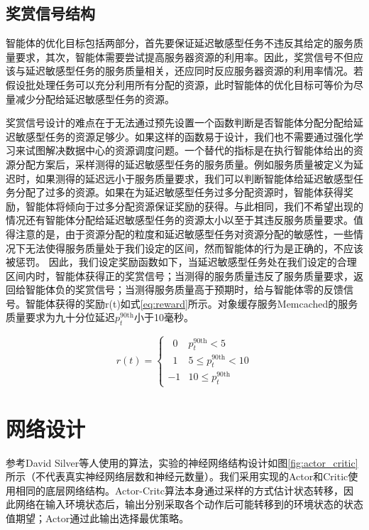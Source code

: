 \subsection{奖赏信号结构}
智能体的优化目标包括两部分，首先要保证延迟敏感型任务不违反其给定的服务质量要求，其次，智能体需要尝试提高服务器资源的利用率。因此，奖赏信号不但应该与延迟敏感型任务的服务质量相关，还应同时反应服务器资源的利用率情况。若假设批处理任务可以充分利用所有分配的资源，此时智能体的优化目标可等价为尽量减少分配给延迟敏感型任务的资源。

奖赏信号设计的难点在于无法通过预先设置一个函数判断是否智能体分配分配给延迟敏感型任务的资源足够少。如果这样的函数易于设计，我们也不需要通过强化学习来试图解决数据中心的资源调度问题。一个替代的指标是在执行智能体给出的资源分配方案后，采样测得的延迟敏感型任务的服务质量。例如服务质量被定义为延迟时，如果测得的延迟远小于服务质量要求，我们可以判断智能体给延迟敏感型任务分配了过多的资源。如果在为延迟敏感型任务过多分配资源时，智能体获得奖励，智能体将倾向于过多分配资源保证奖励的获得。与此相同，我们不希望出现的情况还有智能体分配给延迟敏感型任务的资源太小以至于其违反服务质量要求。值得注意的是，由于资源分配的粒度和延迟敏感型任务对资源分配的敏感性，一些情况下无法使得服务质量处于我们设定的区间，然而智能体的行为是正确的，不应该被惩罚。
因此，我们设定奖励函数如下，当延迟敏感型任务处在我们设定的合理区间内时，智能体获得正的奖赏信号；当测得的服务质量违反了服务质量要求，返回给智能体负的奖赏信号；当测得服务质量高于预期时，给与智能体零的反馈信号。智能体获得的奖励r(t)如式\ref{eq:reward}所示。对象缓存服务Memcached的服务质量要求为九十分位延迟$p^{\operatorname{90th}}_t$小于10毫秒。

\begin{equation}
	r(t) = \begin{cases} 
      \,\,\,0 & p^{\operatorname{90th}}_t< 5 \\
      \,\,\,1 & 5 \le p^{\operatorname{90th}}_t < 10 \\
      -1 & 10 \leq p^{\operatorname{90th}}_t
   \end{cases}
   \label{eq:reward}
\end{equation}


\section{网络设计}
参考David Silver等人使用的算法\cite{mnih2015human}，实验的神经网络结构设计如图\ref{fig:actor_critic}所示（不代表真实神经网络层数和神经元数量）。我们采用实现的Actor和Critic使用相同的底层网络结构。Actor-Critc算法本身通过采样的方式估计状态转移，因此网络在输入环境状态后，输出分别采取各个动作后可能转移到的环境状态的状态值期望；Actor通过此输出选择最优策略。

